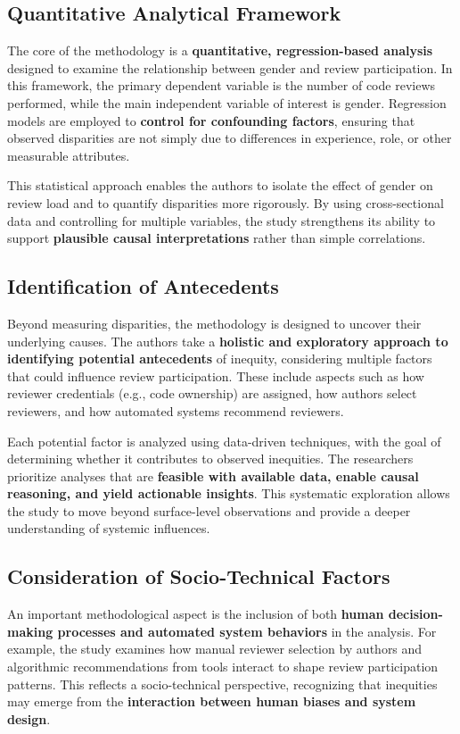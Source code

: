 \subsection{Quantitative Analytical Framework}
The core of the methodology is a \textbf{quantitative, regression-based analysis} designed to examine the relationship between gender and review participation. In this framework, the primary dependent variable is the number of code reviews performed, while the main independent variable of interest is gender. Regression models are employed to \textbf{control for confounding factors}, ensuring that observed disparities are not simply due to differences in experience, role, or other measurable attributes.

This statistical approach enables the authors to isolate the effect of gender on review load and to quantify disparities more rigorously. By using cross-sectional data and controlling for multiple variables, the study strengthens its ability to support \textbf{plausible causal interpretations} rather than simple correlations.

\subsection{Identification of Antecedents}
Beyond measuring disparities, the methodology is designed to uncover their underlying causes. The authors take a \textbf{holistic and exploratory approach to identifying potential antecedents} of inequity, considering multiple factors that could influence review participation. These include aspects such as how reviewer credentials (e.g., code ownership) are assigned, how authors select reviewers, and how automated systems recommend reviewers.

Each potential factor is analyzed using data-driven techniques, with the goal of determining whether it contributes to observed inequities. The researchers prioritize analyses that are \textbf{feasible with available data, enable causal reasoning, and yield actionable insights}. This systematic exploration allows the study to move beyond surface-level observations and provide a deeper understanding of systemic influences.

\subsection{Consideration of Socio-Technical Factors}
An important methodological aspect is the inclusion of both \textbf{human decision-making processes and automated system behaviors} in the analysis. For example, the study examines how manual reviewer selection by authors and algorithmic recommendations from tools interact to shape review participation patterns. This reflects a socio-technical perspective, recognizing that inequities may emerge from the \textbf{interaction between human biases and system design}.

